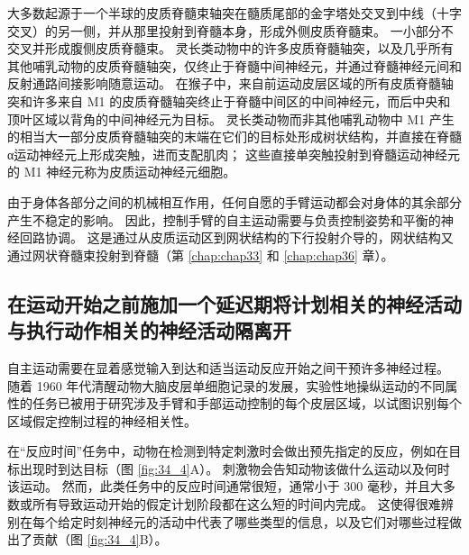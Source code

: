 大多数起源于一个半球的皮质脊髓束轴突在髓质尾部的金字塔处交叉到中线（十字交叉）的另一侧，并从那里投射到脊髓本身，形成外侧皮质脊髓束。 一小部分不交叉并形成腹侧皮质脊髓束。 灵长类动物中的许多皮质脊髓轴突，以及几乎所有其他哺乳动物的皮质脊髓轴突，仅终止于脊髓中间神经元，并通过脊髓神经元间和反射通路间接影响随意运动。 在猴子中，来自前运动皮层区域的所有皮质脊髓轴突和许多来自 M1 的皮质脊髓轴突终止于脊髓中间区的中间神经元，而后中央和顶叶区域以背角的中间神经元为目标。 灵长类动物而非其他哺乳动物中 M1 产生的相当大一部分皮质脊髓轴突的末端在它们的目标处形成树状结构，并直接在脊髓α运动神经元上形成突触，进而支配肌肉； 这些直接单突触投射到脊髓运动神经元的 M1 神经元称为皮质运动神经元细胞。

由于身体各部分之间的机械相互作用，任何自愿的手臂运动都会对身体的其余部分产生不稳定的影响。 因此，控制手臂的自主运动需要与负责控制姿势和平衡的神经回路协调。 这是通过从皮质运动区到网状结构的下行投射介导的，网状结构又通过网状脊髓束投射到脊髓（第 \ref{chap:chap33} 和 \ref{chap:chap36} 章）。

\subsection{在运动开始之前施加一个延迟期将计划相关的神经活动与执行动作相关的神经活动隔离开}
自主运动需要在显着感觉输入到达和适当运动反应开始之间干预许多神经过程。 随着 1960 年代清醒动物大脑皮层单细胞记录的发展，实验性地操纵运动的不同属性的任务已被用于研究涉及手臂和手部运动控制的每个皮层区域，以试图识别每个区域假定控制过程的神经相关性。

在“反应时间”任务中，动物在检测到特定刺激时会做出预先指定的反应，例如在目标出现时到达目标（图 \ref{fig:34_4}A）。 
刺激物会告知动物该做什么运动以及何时该运动。 然而，此类任务中的反应时间通常很短，通常小于 300 毫秒，并且大多数或所有导致运动开始的假定计划阶段都在这么短的时间内完成。 这使得很难辨别在每个给定时刻神经元的活动中代表了哪些类型的信息，以及它们对哪些过程做出了贡献（图 \ref{fig:34_4}B）。

